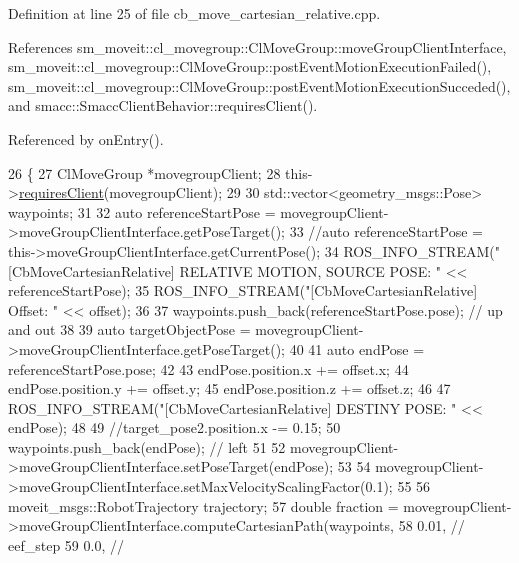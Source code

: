 Definition at line 25 of file cb\+\_\+move\+\_\+cartesian\+\_\+relative.\+cpp.



References sm\+\_\+moveit\+::cl\+\_\+movegroup\+::\+Cl\+Move\+Group\+::move\+Group\+Client\+Interface, sm\+\_\+moveit\+::cl\+\_\+movegroup\+::\+Cl\+Move\+Group\+::post\+Event\+Motion\+Execution\+Failed(), sm\+\_\+moveit\+::cl\+\_\+movegroup\+::\+Cl\+Move\+Group\+::post\+Event\+Motion\+Execution\+Succeded(), and smacc\+::\+Smacc\+Client\+Behavior\+::requires\+Client().



Referenced by on\+Entry().


\begin{DoxyCode}
26 \{
27     ClMoveGroup *movegroupClient;
28     this->\hyperlink{classsmacc_1_1SmaccClientBehavior_a917f001e763a1059af337bf4e164f542}{requiresClient}(movegroupClient);
29 
30     std::vector<geometry\_msgs::Pose> waypoints;
31 
32     \textcolor{keyword}{auto} referenceStartPose = movegroupClient->moveGroupClientInterface.getPoseTarget();
33     \textcolor{comment}{//auto referenceStartPose = this->moveGroupClientInterface.getCurrentPose();}
34     ROS\_INFO\_STREAM(\textcolor{stringliteral}{"[CbMoveCartesianRelative] RELATIVE MOTION, SOURCE POSE: "} << referenceStartPose);
35     ROS\_INFO\_STREAM(\textcolor{stringliteral}{"[CbMoveCartesianRelative] Offset: "} << offset);
36 
37     waypoints.push\_back(referenceStartPose.pose); \textcolor{comment}{// up and out}
38 
39     \textcolor{keyword}{auto} targetObjectPose = movegroupClient->moveGroupClientInterface.getPoseTarget();
40 
41     \textcolor{keyword}{auto} endPose = referenceStartPose.pose;
42 
43     endPose.position.x += offset.x;
44     endPose.position.y += offset.y;
45     endPose.position.z += offset.z;
46 
47     ROS\_INFO\_STREAM(\textcolor{stringliteral}{"[CbMoveCartesianRelative] DESTINY POSE: "} << endPose);
48 
49     \textcolor{comment}{//target\_pose2.position.x -= 0.15;}
50     waypoints.push\_back(endPose); \textcolor{comment}{// left}
51 
52     movegroupClient->moveGroupClientInterface.setPoseTarget(endPose);
53 
54     movegroupClient->moveGroupClientInterface.setMaxVelocityScalingFactor(0.1);
55 
56     moveit\_msgs::RobotTrajectory trajectory;
57     \textcolor{keywordtype}{double} fraction = movegroupClient->moveGroupClientInterface.computeCartesianPath(waypoints,
58                                                                                      0.01, \textcolor{comment}{// eef\_step}
59                                                                                      0.0,  \textcolor{comment}{//
}
\end{DoxyCode}
